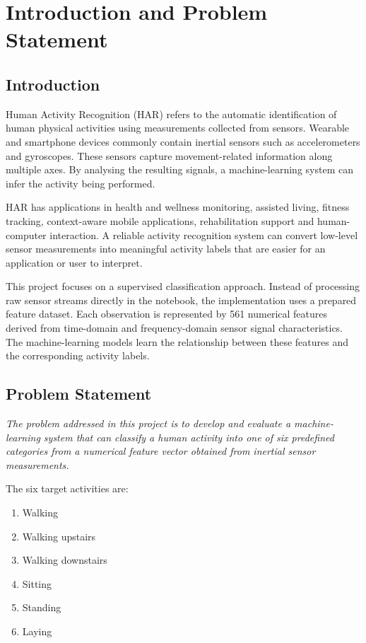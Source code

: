 \chapter{Introduction and Problem Statement}
\section{Introduction}
Human Activity Recognition (HAR) refers to the automatic identification of human physical activities using measurements collected from sensors. Wearable and smartphone devices commonly contain inertial sensors such as accelerometers and gyroscopes. These sensors capture movement-related information along multiple axes. By analysing the resulting signals, a machine-learning system can infer the activity being performed.

HAR has applications in health and wellness monitoring, assisted living, fitness tracking, context-aware mobile applications, rehabilitation support and human-computer interaction. A reliable activity recognition system can convert low-level sensor measurements into meaningful activity labels that are easier for an application or user to interpret.

This project focuses on a supervised classification approach. Instead of processing raw sensor streams directly in the notebook, the implementation uses a prepared feature dataset. Each observation is represented by 561 numerical features derived from time-domain and frequency-domain sensor signal characteristics. The machine-learning models learn the relationship between these features and the corresponding activity labels.

\section{Problem Statement}
\emph{The problem addressed in this project is to develop and evaluate a machine-learning system that can classify a human activity into one of six predefined categories from a numerical feature vector obtained from inertial sensor measurements.}

The six target activities are:
\begin{enumerate}[label=\arabic*.]
\item Walking
\item Walking upstairs
\item Walking downstairs
\item Sitting
\item Standing
\item Laying
\end{enumerate}


